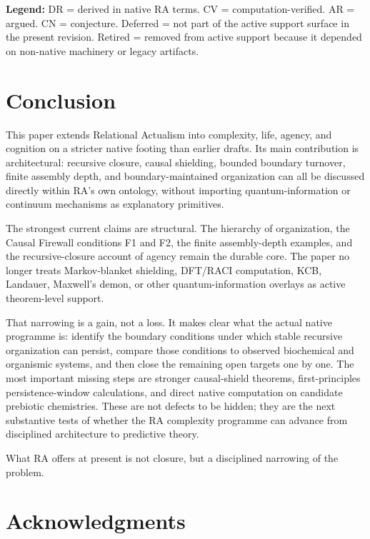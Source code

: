 \documentclass[11pt]{article}
\begin{document}
\textbf{Legend:} DR = derived in native RA terms. CV = computation-verified. AR = argued. CN = conjecture. Deferred = not part of the active support surface in the present revision. Retired = removed from active support because it depended on non-native machinery or legacy artifacts.

\section{Conclusion}
\label{sec:conclusion}

This paper extends Relational Actualism into complexity, life, agency, and cognition on a stricter native footing than earlier drafts. Its main contribution is architectural: recursive closure, causal shielding, bounded boundary turnover, finite assembly depth, and boundary-maintained organization can all be discussed directly within RA's own ontology, without importing quantum-information or continuum mechanisms as explanatory primitives.

The strongest current claims are structural. The hierarchy of organization, the Causal Firewall conditions F1 and F2, the finite assembly-depth examples, and the recursive-closure account of agency remain the durable core. The paper no longer treats Markov-blanket shielding, DFT/RACI computation, KCB, Landauer, Maxwell's demon, or other quantum-information overlays as active theorem-level support.

That narrowing is a gain, not a loss. It makes clear what the actual native programme is: identify the boundary conditions under which stable recursive organization can persist, compare those conditions to observed biochemical and organismic systems, and then close the remaining open targets one by one. The most important missing steps are stronger causal-shield theorems, first-principles persistence-window calculations, and direct native computation on candidate prebiotic chemistries. These are not defects to be hidden; they are the next substantive tests of whether the RA complexity programme can advance from disciplined architecture to predictive theory.

What RA offers at present is not closure, but a disciplined narrowing of the problem.

\section*{Acknowledgments}
\end{document}
